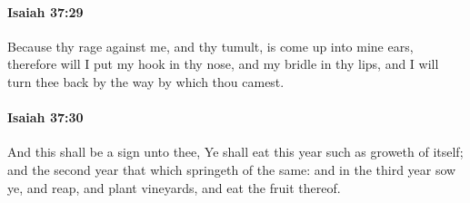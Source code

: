 		\paragraph{Isaiah 37:29} %
			\label{ISAIAH-37-29}

			Because thy rage against me, and thy tumult, is come up into mine ears, therefore will I put my hook in thy nose, and my bridle in thy lips, and I will turn thee back by the way by which thou camest.


		\paragraph{Isaiah 37:30} %
			\label{ISAIAH-37-30}

			And this shall be a sign unto thee, Ye shall eat this year such as groweth of itself; and the second year that which springeth of the same: and in the third year sow ye, and reap, and plant vineyards, and eat the fruit thereof.

